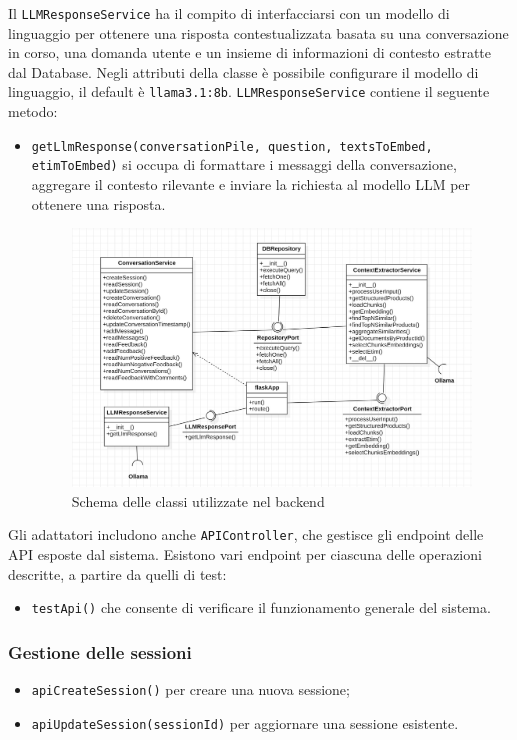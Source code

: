 Il \texttt{LLMResponseService} ha il compito di interfacciarsi con un modello di linguaggio per ottenere una risposta contestualizzata basata su una conversazione in corso, una domanda utente e un insieme di informazioni di contesto estratte dal Database.
Negli attributi della classe \`e possibile configurare il modello di linguaggio, il default \`e \texttt{llama3.1:8b}.
\texttt{LLMResponseService} contiene il seguente metodo:
\begin{itemize}
    \item \texttt{getLlmResponse(conversationPile, question, textsToEmbed, etimToEmbed)} si occupa di formattare i messaggi della conversazione, aggregare il contesto rilevante e inviare la richiesta al modello LLM per ottenere una risposta.
\begin{figure}[H]
    \centering
    \includegraphics[width=\textwidth]{images/BackendUML.jpeg}
    \caption{Schema delle classi utilizzate nel backend}
    \label{fig:architettura}
\end{figure}

\end{itemize}

Gli adattatori includono anche \texttt{APIController}, che gestisce gli endpoint delle API esposte dal sistema. Esistono vari endpoint per ciascuna delle operazioni descritte, a partire da quelli di test:
\begin{itemize}
    \item \texttt{testApi()} che consente di verificare il funzionamento generale del sistema.
\end{itemize}

\subsubsection*{Gestione delle sessioni}
\begin{itemize}
    \item \texttt{apiCreateSession()} per creare una nuova sessione;
    \item \texttt{apiUpdateSession(sessionId)} per aggiornare una sessione esistente.
\end{itemize}

